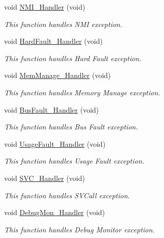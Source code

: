 \begin{DoxyCompactItemize}
void \hyperlink{group___d_a_c___signals_generation_ga6ad7a5e3ee69cb6db6a6b9111ba898bc}{N\-M\-I\-\_\-\-Handler} (void)
\begin{DoxyCompactList}\small\item\em This function handles N\-M\-I exception. \end{DoxyCompactList}\item 
void \hyperlink{group___d_a_c___signals_generation_ga2bffc10d5bd4106753b7c30e86903bea}{Hard\-Fault\-\_\-\-Handler} (void)
\begin{DoxyCompactList}\small\item\em This function handles Hard Fault exception. \end{DoxyCompactList}\item 
void \hyperlink{group___d_a_c___signals_generation_ga3150f74512510287a942624aa9b44cc5}{Mem\-Manage\-\_\-\-Handler} (void)
\begin{DoxyCompactList}\small\item\em This function handles Memory Manage exception. \end{DoxyCompactList}\item 
void \hyperlink{group___d_a_c___signals_generation_ga850cefb17a977292ae5eb4cafa9976c3}{Bus\-Fault\-\_\-\-Handler} (void)
\begin{DoxyCompactList}\small\item\em This function handles Bus Fault exception. \end{DoxyCompactList}\item 
void \hyperlink{group___d_a_c___signals_generation_ga1d98923de2ed6b7309b66f9ba2971647}{Usage\-Fault\-\_\-\-Handler} (void)
\begin{DoxyCompactList}\small\item\em This function handles Usage Fault exception. \end{DoxyCompactList}\item 
void \hyperlink{group___d_a_c___signals_generation_ga3e5ddb3df0d62f2dc357e64a3f04a6ce}{S\-V\-C\-\_\-\-Handler} (void)
\begin{DoxyCompactList}\small\item\em This function handles S\-V\-Call exception. \end{DoxyCompactList}\item 
void \hyperlink{group___d_a_c___signals_generation_gadbdfb05858cc36fc520974df37ec3cb0}{Debug\-Mon\-\_\-\-Handler} (void)
\begin{DoxyCompactList}\small\item\em This function handles Debug Monitor exception. \end{DoxyCompactList}\item 

\end{DoxyCompactItemize}
